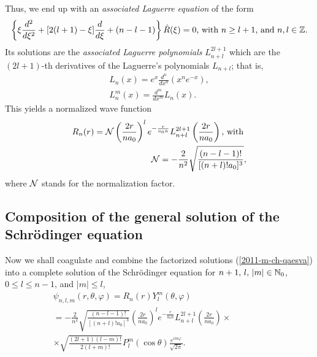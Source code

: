 Thus,  we end up with an {\em associated Laguerre equation}
 of the form
\begin{equation}
\left\{
  \xi    \frac{d^2}{   d     \xi  ^2 }
+[2(l+1)-  \xi  ]  \frac{d }{   d       \xi  }
+(n-l-1)
\right\}    \hat{R}(   \xi  ) =0
\textrm{, with } n \ge l+1\textrm{, and } n,l\in {\Bbb Z}.
\label{2011-m-ch-qaeale}
\end{equation}
Its   solutions are  the {\it associated Laguerre polynomials}
$L^{2l+1}_{n+l}$
which are the $(2l+1)$-th derivatives of the
Laguerre's polynomials  $L_{n+l}$; 
that is,
\begin{equation}
\begin{split}
 L_n(x)=e^x   \frac{d^n }{   d     x^n }  \left (x^ne^{-x}\right),\\
 L_n^m(x)=   \frac{d^m }{   d     x^m }  L_n(x).
\end{split}
\label{2011-m-ch-qaelp}
\end{equation}
This yields a normalized wave function
\begin{equation}
\begin{split}
R_n(r) =  {\cal N}
\left( \frac{2 {r}}{n a_0 }\right)^l e^{-\frac{r}{a_0 n}}
L^{2l+1}_{n+l} \left( \frac{2 {r}}{n a_0 }\right)\textrm{, with }\\
{\cal N}   =-\frac{2}{n^2}\sqrt{\frac{(n-l-1)!}{[(n+l)!a_0]^3}} ,
\end{split}
\label{2011-m-ch-qaecsrp}
\end{equation}
where
${\cal N}$ stands for the normalization factor.

\subsection{Composition of the general solution of the Schr\"odinger equation}

Now we shall coagulate
and combine the factorized solutions (\ref{2011-m-ch-qaesva})
into a complete solution of the Schr\"odinger equation
for $n+1,\, l,\, \vert m \vert  \in {\Bbb N}_0$, $0\le l\le n-1$, and $\vert m \vert \le l$,
\begin{equation}
\begin{split}
\psi_{n,l,m} (r, \theta ,\varphi )
 = R_n(r)Y_l^m ( \theta ,\varphi )\\
 = -\frac{2}{n^2}\sqrt{\frac{(n-l-1)!}{[(n+l)!a_0]^3}}
\left( \frac{2 {r}}{n a_0 }\right)^l e^{-\frac{r}{a_0 n}}
L^{2l+1}_{n+l} \left( \frac{2 {r}}{n a_0 }\right) \times \qquad \qquad  \\
\times \sqrt{\frac {(2l+1)(l-m)!}{2 (l+m)!}}  P_l^m(\cos \theta )
\frac {e^{im\varphi }}{\sqrt{2\pi}} .
\end{split}
\label{2011-m-ch-qaesva13444}
\end{equation}



